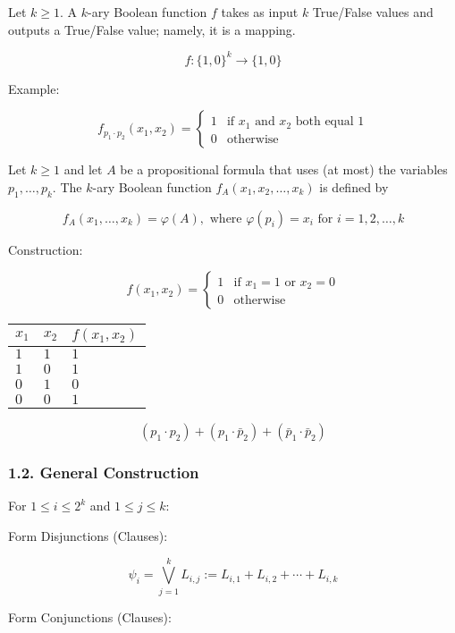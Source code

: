 Let \(k \geq 1\). A \(k\)-ary Boolean function \(f\) takes as input
\(k\) True/False values and outputs a True/False value; namely, it is a
mapping.

\[f : \{1, 0\}^k \rightarrow \{1, 0\}\]

Example:

\[f_{p_1 \cdot p_2}(x_1, x_2) = \begin{cases} 1 & \text{if } x_1 \text{ and } x_2 \text{ both equal } 1 \\ 0 & \text{otherwise} \end{cases}\]

Let \(k \geq 1\) and let \(A\) be a propositional formula that uses (at
most) the variables \(p_1, \ldots, p_k\). The \(k\)-ary Boolean function
\(f_A(x_1, x_2, \ldots, x_k)\) is defined by

\[f_A(x_1, \ldots, x_k) = \varphi(A), \text{ where } \varphi(p_i) = x_i \text{ for } i = 1, 2, \ldots, k\]

Construction:

\[f(x_1, x_2) = \begin{cases} 1 & \text{if } x_1 = 1 \text{ or } x_2 = 0 \\ 0 & \text{otherwise} \end{cases}\]

\begin{longtable}[]{@{}lll@{}}
\toprule\noalign{}
\(x_1\) & \(x_2\) & \(f(x_1, x_2)\) \\
\midrule\noalign{}
\endhead
\bottomrule\noalign{}
\endlastfoot
\(1\) & \(1\) & \(1\) \\
\(1\) & \(0\) & \(1\) \\
\(0\) & \(1\) & \(0\) \\
\(0\) & \(0\) & \(1\) \\
\end{longtable}

\[(p_1 \cdot p_2) + (p_1 \cdot \bar p_2) + (\bar p_1 \cdot \bar p_2)\]

\subsubsection{1.2. General Construction}\label{general-construction}

For \(1 \leq i \leq 2^k\) and \(1 \leq j \leq k\):

Form Disjunctions (Clauses):

\[\psi_i = \displaystyle\bigvee_{j=1}^k L_{i,j} := L_{i,1} + L_{i,2} + \cdots + L_{i,k}\]

Form Conjunctions (Clauses):

